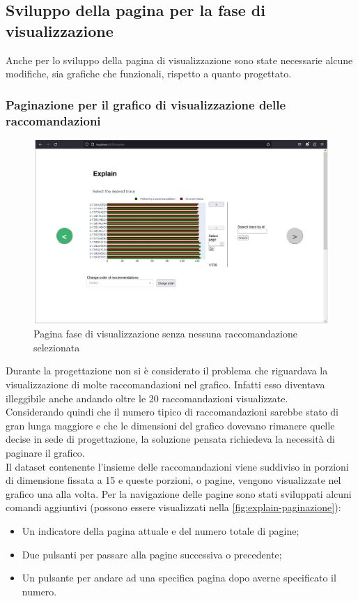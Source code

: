 \subsection{Sviluppo della pagina per la fase di visualizzazione}
Anche per lo sviluppo della pagina di visualizzazione sono state necessarie alcune modifiche, sia grafiche che funzionali, rispetto a quanto progettato.

\subsubsection{Paginazione per il grafico di visualizzazione delle raccomandazioni}

\begin{figure}[H] 
    \centering 
    \includegraphics[width=0.7\columnwidth]{immagini/pag-explain-first-access.jpg} 
    \caption{Pagina fase di visualizzazione senza nessuna raccomandazione selezionata}
    \label{fig:explain-paginazione}
\end{figure}

Durante la progettazione non si è considerato il problema che riguardava la visualizzazione di molte raccomandazioni nel grafico. Infatti esso diventava illeggibile anche andando oltre le 20 raccomandazioni visualizzate. 
\\
Considerando quindi che il numero tipico di raccomandazioni sarebbe stato di gran lunga maggiore e che le dimensioni del grafico dovevano rimanere quelle decise in sede di progettazione, la soluzione pensata richiedeva la necessità di paginare il grafico.
\\
Il dataset contenente l'insieme delle raccomandazioni viene suddiviso in porzioni di dimensione fissata a 15 e queste porzioni, o pagine, vengono visualizzate nel grafico una alla volta. Per la navigazione delle pagine sono stati sviluppati alcuni comandi aggiuntivi (possono essere visualizzati nella \autoref{fig:explain-paginazione}):

\begin{itemize}
\item Un indicatore della pagina attuale e del numero totale di pagine;

\item Due pulsanti per passare alla pagine successiva o precedente;

\item Un pulsante per andare ad una specifica pagina dopo averne specificato il numero.

\end{itemize}

